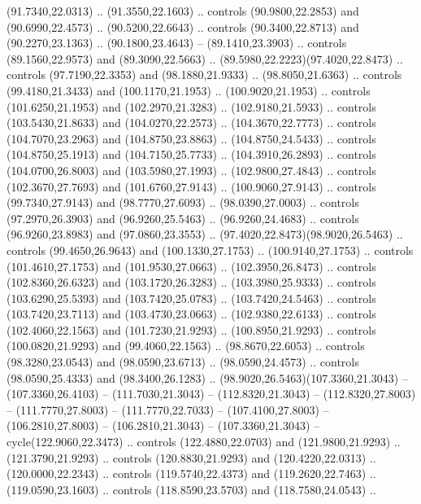 \begin{scope}[cm={{1.25,0.0,0.0,-1.25,(0.0,59.09163)}}]
        (91.7340,22.0313) .. (91.3550,22.1603) .. controls (90.9800,22.2853) and
        (90.6990,22.4573) .. (90.5200,22.6643) .. controls (90.3400,22.8713) and
        (90.2270,23.1363) .. (90.1800,23.4643) -- (89.1410,23.3903) .. controls
        (89.1560,22.9573) and (89.3090,22.5663) .. (89.5980,22.2223)(97.4020,22.8473)
        .. controls (97.7190,22.3353) and (98.1880,21.9333) .. (98.8050,21.6363) ..
        controls (99.4180,21.3433) and (100.1170,21.1953) .. (100.9020,21.1953) ..
        controls (101.6250,21.1953) and (102.2970,21.3283) .. (102.9180,21.5933) ..
        controls (103.5430,21.8633) and (104.0270,22.2573) .. (104.3670,22.7773) ..
        controls (104.7070,23.2963) and (104.8750,23.8863) .. (104.8750,24.5433) ..
        controls (104.8750,25.1913) and (104.7150,25.7733) .. (104.3910,26.2893) ..
        controls (104.0700,26.8003) and (103.5980,27.1993) .. (102.9800,27.4843) ..
        controls (102.3670,27.7693) and (101.6760,27.9143) .. (100.9060,27.9143) ..
        controls (99.7340,27.9143) and (98.7770,27.6093) .. (98.0390,27.0003) ..
        controls (97.2970,26.3903) and (96.9260,25.5463) .. (96.9260,24.4683) ..
        controls (96.9260,23.8983) and (97.0860,23.3553) ..
        (97.4020,22.8473)(98.9020,26.5463) .. controls (99.4650,26.9643) and
        (100.1330,27.1753) .. (100.9140,27.1753) .. controls (101.4610,27.1753) and
        (101.9530,27.0663) .. (102.3950,26.8473) .. controls (102.8360,26.6323) and
        (103.1720,26.3283) .. (103.3980,25.9333) .. controls (103.6290,25.5393) and
        (103.7420,25.0783) .. (103.7420,24.5463) .. controls (103.7420,23.7113) and
        (103.4730,23.0663) .. (102.9380,22.6133) .. controls (102.4060,22.1563) and
        (101.7230,21.9293) .. (100.8950,21.9293) .. controls (100.0820,21.9293) and
        (99.4060,22.1563) .. (98.8670,22.6053) .. controls (98.3280,23.0543) and
        (98.0590,23.6713) .. (98.0590,24.4573) .. controls (98.0590,25.4333) and
        (98.3400,26.1283) .. (98.9020,26.5463)(107.3360,21.3043) -- (107.3360,26.4103)
        -- (111.7030,21.3043) -- (112.8320,21.3043) -- (112.8320,27.8003) --
        (111.7770,27.8003) -- (111.7770,22.7033) -- (107.4100,27.8003) --
        (106.2810,27.8003) -- (106.2810,21.3043) -- (107.3360,21.3043) --
        cycle(122.9060,22.3473) .. controls (122.4880,22.0703) and (121.9800,21.9293)
        .. (121.3790,21.9293) .. controls (120.8830,21.9293) and (120.4220,22.0313) ..
        (120.0000,22.2343) .. controls (119.5740,22.4373) and (119.2620,22.7463) ..
        (119.0590,23.1603) .. controls (118.8590,23.5703) and (118.7580,24.0543) ..

\end{scope}

